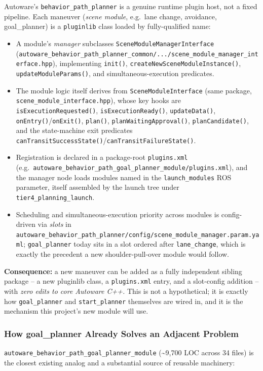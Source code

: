 \documentclass[11pt]{article}
\newcommand{\code}[1]{\texttt{#1}}
\newcommand{\pkg}[1]{\texttt{#1}}
\begin{document}
Autoware's \pkg{behavior\_path\_planner} is a genuine runtime plugin host, not a fixed pipeline.
Each maneuver (\emph{scene module}, e.g.\ lane change, avoidance, goal\_planner) is a
\code{pluginlib} class loaded by fully-qualified name:

\begin{itemize}[leftmargin=1.4em]
  \item A module's \emph{manager} subclasses \code{SceneModuleManagerInterface}
  (\code{autoware\_behavior\_path\_planner\_common/.../scene\_module\_manager\_interface.hpp}),
  implementing \code{init()}, \code{createNewSceneModuleInstance()},
  \code{updateModuleParams()}, and simultaneous-execution predicates.
  \item The module logic itself derives from \code{SceneModuleInterface}
  (same package, \code{scene\_module\_interface.hpp}), whose key hooks are
  \code{isExecutionRequested()}, \code{isExecutionReady()}, \code{updateData()},
  \code{onEntry()}/\code{onExit()}, \code{plan()}, \code{planWaitingApproval()},
  \code{planCandidate()}, and the state-machine exit predicates
  \code{canTransitSuccessState()}/\code{canTransitFailureState()}.
  \item Registration is declared in a package-root \code{plugins.xml}
  (e.g.\ \pkg{autoware\_behavior\_path\_goal\_planner\_module/plugins.xml}), and the manager node
  loads modules named in the \code{launch\_modules} ROS parameter, itself assembled by the launch
  tree under \pkg{tier4\_planning\_launch}.
  \item Scheduling and simultaneous-execution priority across modules is config-driven via
  \emph{slots} in \pkg{autoware\_behavior\_path\_planner/config/scene\_module\_manager.param.yaml};
  \pkg{goal\_planner} today sits in a slot ordered after \pkg{lane\_change}, which is exactly the
  precedent a new shoulder-pull-over module would follow.
\end{itemize}

\textbf{Consequence:} a new maneuver can be added as a fully independent sibling package -- a new
pluginlib class, a \code{plugins.xml} entry, and a slot-config addition -- with \emph{zero edits to
core Autoware C++.} This is not a hypothetical; it is exactly how \pkg{goal\_planner} and
\pkg{start\_planner} themselves are wired in, and it is the mechanism this project's new module will
use.

\subsubsection{How goal\_planner Already Solves an Adjacent Problem}
\pkg{autoware\_behavior\_path\_goal\_planner\_module} (\textasciitilde9{,}700 LOC across 34 files)
is the closest existing analog and a substantial source of reusable machinery:
\end{document}
